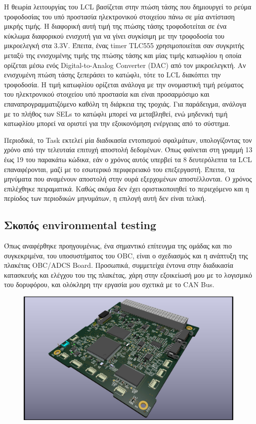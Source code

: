 \documentclass[a4paper,nobib,justified]{tufte-book}
\begin{document}
Η θεωρία λειτουργίας του LCL βασίζεται στην πτώση τάσης που δημιουργεί το ρεύμα τροφοδοσίας του υπό προστασία ηλεκτρονικού στοιχείου πάνω σε μία αντίσταση μικρής τιμής. Η διαφορική αυτή τιμή της πτώσης τάσης τροφοδοτείται σε ένα κύκλωμα διαφορικού ενισχυτή για να γίνει συγκίσιμη με την τροφοδοσία του μικροελεγκή στα 3.3V. Έπειτα, ένας timer TLC555 χρησιμοποιείται σαν συγκριτής μεταξύ της ενισχυμένης τιμής της πτώσης τάσης και μίας τιμής κατωφλίου η οποία ορίζεται μέσω ενός Digital-to-Analog Converter (DAC) από τον μικροελεγκτή. Αν ενισχυμένη πτώση τάσης ξεπεράσει το κατώφλι, τότε το LCL διακόπτει την τροφοδοσία. Η τιμή κατωφλίου ορίζεται ανάλογα με την ονομαστική τιμή ρεύματος του ηλεκτρονικού στοιχείου υπό προστασία και είναι προσαρμόσιμο και επαναπρογραμματιζόμενο καθόλη τη διάρκεια της τροχιάς. Για παράδειγμα, ανάλογα με το πλήθος των SELs το κατώφλι μπορεί να μεταβληθεί, ενώ μηδενική τιμή κατωφλίου μπορεί να οριστεί για την εξοικονόμηση ενέργειας από το σύστημα.

\par Περιοδικά, το Task εκτελεί μία διαδικασία εντοπισμού σφαλμάτων, υπολογίζοντας τον χρόνο από την τελευταία επιτυχή αποστολή δεδομένων. Όπως φαίνεται στη γραμμή 13 έως 19 του παρακάτω κώδικα, εάν ο χρόνος αυτός υπερβεί τα 8 δευτερόλεπτα τα LCL επαναφέρονται, μαζί με το εσωτερικό περιφερειακό του επεξεργαστή. Έπειτα, τα μηνύματα που αναμένουν αποστολή στην ουρά εξερχομένων αποστέλλονται. Ο χρόνος επιλέχθηκε πειραματικά. Καθώς ακόμα δεν έχει οριστικοποιηθεί το περιεχόμενο και η περίοδος των περιοδικών μηνυμάτων, η επιλογή αυτή δεν είναι τελική.

\subsection{Σκοπός environmental testing}
Όπως αναφέρθηκε προηγουμένως, ένα σημαντικό επίτευγμα της ομάδας και πιο συγκεκριμένα, του υποσυστήματος του OBC, είναι ο σχεδιασμός και η ανάπτυξη της πλακέτας OBC/ADCS Board. Προσωπικά, συμμετείχα έντονα στην διαδικασία κατασκευής και ελέγχου του της πλακέτας, χάρη στην εξοικείωσή μου με το λογισμικό του δορυφόρου, και ολόκληρη την εργασία μου σχετικά με το CAN Bus.

\begin{figure}[ht]
	\includegraphics{media/images/obc-adcs-board.jpg}
\end{figure}
\end{document}
